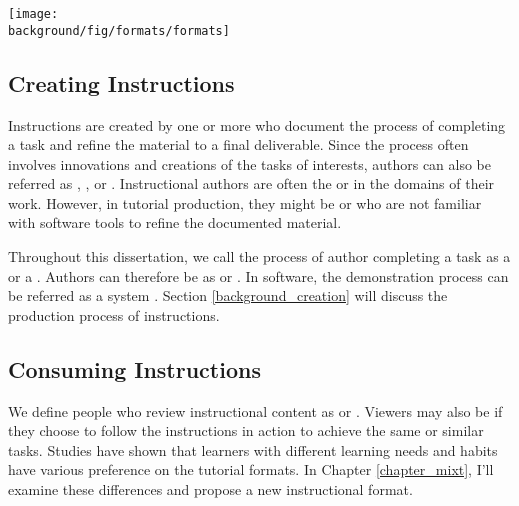 \begin{figure*}[th!]
  \centering
  \begin{minipage}{\textwidth}
  \texttt{[image: \\background/fig/formats/formats]}
  \caption[Major tutorial forms from online resources.]{
    Major tutorial forms from online resources \footnote{Combine photos on the go, \url{https://helpx.adobe.com/mobile-apps/how-to/combine-photos-photoshop-mix.html}} \footnote{Change the color of an object, \url{https://helpx.adobe.com/photoshop/how-to/change-color-object-photoshop.html}}:
    a) Step-by-step static tutorials show a list of steps, each with text and figure(s) that describe a subtask, such as  or , and
    b) video tutorials show an author performing the task, which can be reviewed and controlled via a video player.
  }
  \label{fig:background_formats}
  \end{minipage}
\end{figure*}


\subsection{Creating Instructions}
Instructions are created by one or more  who document the process of completing a task and refine the material to a final deliverable.
%
Since the process often involves innovations and creations of the tasks of interests, authors can also be referred as , , or .
%
Instructional authors are often the  or  in the domains of their work. However, in tutorial production, they might be  or  who are not familiar with software tools to refine the documented material.

Throughout this dissertation, we call the process of author completing a task as a  or a . Authors can therefore be as  or .
%
In software, the demonstration process can be referred as a system . Section \ref{background_creation} will discuss the production process of instructions.


\subsection{Consuming Instructions}
We define people who review instructional content as  or . Viewers may also be  if they choose to follow the instructions in action to achieve the same or similar tasks.
%
Studies have shown that learners with different learning needs and habits have various preference on the tutorial formats. In Chapter \ref{chapter_mixt}, I'll examine these differences and propose a new instructional format.

